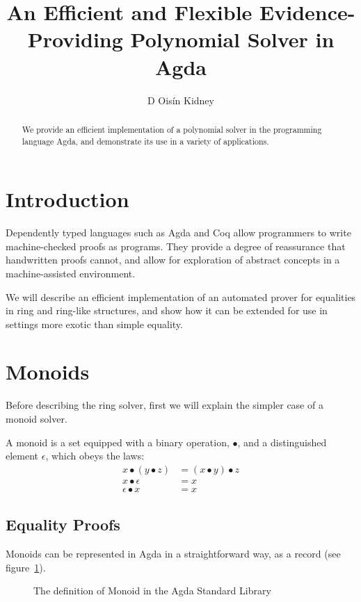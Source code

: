 \documentclass[draft, twocolumn]{article}
\author{D Oisín Kidney}
\title{An Efficient and Flexible Evidence-Providing Polynomial Solver in Agda}
\begin{document}
\maketitle
\begin{abstract}
  We provide an efficient implementation of a polynomial solver in the
  programming language Agda, and demonstrate its use in a variety of
  applications.
\end{abstract}
\tableofcontents
\section{Introduction}
Dependently typed languages such as Agda\cite{norell_dependently_2008} and
Coq\cite{the_coq_development_team_2018_1219885} allow programmers to write
machine-checked proofs as programs. They provide a degree of reassurance that
handwritten proofs cannot, and allow for exploration of abstract concepts in a
machine-assisted environment.

We will describe an efficient implementation of an automated prover for
equalities in ring and ring-like structures, and show how it can be extended for
use in settings more exotic than simple equality.
\section{Monoids}
Before describing the ring solver, first we will explain the simpler case of a
monoid solver.

A monoid is a set equipped with a binary operation, \(\bullet\), and a
distinguished element \(\epsilon\), which obeys the laws:
\begin{align}
  x \bullet (y \bullet z) &= (x \bullet y) \bullet z \tag{Associativity} \\
  x \bullet \epsilon      &= x \tag{Left Identity} \\
  \epsilon \bullet x      &= x \tag{Right Identity}
\end{align}
\subsection{Equality Proofs}
Monoids can be represented in Agda in a straightforward way, as a record (see
figure~\ref{mon-def}).
\begin{figure}
  \caption{The definition of Monoid in the Agda Standard
    Library\cite{danielsson_agda_2018}}
  \label{mon-def}
\end{figure}
\end{document}
